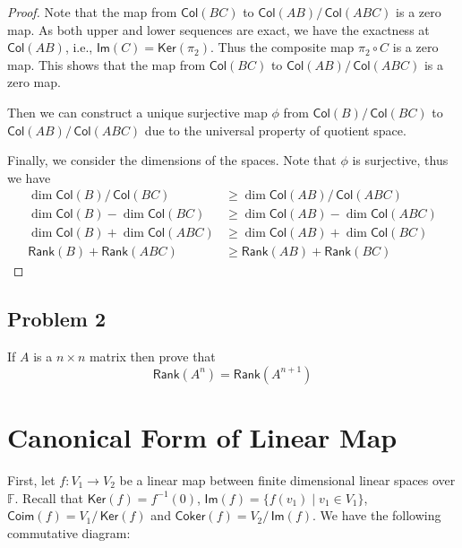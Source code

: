 \documentclass[
	11pt, %
	fleqn, %
	a4paper, %
]{LegrandOrangeBook}
\renewcommand{\ker}[1]{\mathsf{Ker}(#1)} %
\renewcommand{\Im}[1]{\mathsf{Im}(#1)} %
\newcommand{\quotient}[2]{#1/\, #2} %
\newcommand{\F}{\mathbb{F}} %
\newcommand{\rank}[1]{\mathsf{Rank}(#1)} %
\newcommand{\coker}[1]{\mathsf{Coker}(#1)} %
\newcommand{\coim}[1]{\mathsf{Coim}(#1)} %
\newcommand{\col}[1]{\mathsf{Col}(#1)} %
\begin{document}
\begin{proof}
    Note that the map from $\col{BC}$ to $\quotient{\col{AB}}{\col{ABC}}$ is a zero map. As both upper and lower sequences are exact, we have the exactness at $\col{AB}$, i.e., $\Im{C} = \ker{\pi_2}$. Thus the composite map $\pi_2 \circ C$ is a zero map. This shows that the map from $\col{BC}$ to $\quotient{\col{AB}}{\col{ABC}}$ is a zero map.

    Then we can construct a unique surjective map $\phi$ from $\quotient{\col{B}}{\col{BC}}$ to $\quotient{\col{AB}}{\col{ABC}}$ due to the universal property of quotient space.

    Finally, we consider the dimensions of the spaces. Note that $\phi$ is surjective, thus we have
    \[
        \begin{split}
            \dim{\quotient{\col{B}}{\col{BC}}} & \geq \dim{\quotient{\col{AB}}{\col{ABC}}} \\
            \dim{\col{B}} - \dim{\col{BC}} & \geq \dim{\col{AB}} - \dim{\col{ABC}} \\
            \dim{\col{B}} + \dim{\col{ABC}} & \geq \dim{\col{AB}} + \dim{\col{BC}} \\
            \rank{B} + \rank{ABC} & \geq \rank{AB} + \rank{BC}
        \end{split}
    \]
\end{proof}

\subsection{Problem 2}

\begin{problem}
    If $A$ is a $n \times n$ matrix then prove that
    \[
        \rank{A^n} = \rank{A^{n+1}}
    \]
\end{problem}


\newpage

\section{Canonical Form of Linear Map}

First, let $f : V_1 \to V_2$ be a linear map between finite dimensional linear spaces over $\F$. Recall that $\ker{f} = f^{-1} (0)$, $\Im{f} = \{f(v_1) \mid v_1 \in V_1\}$, $\coim{f} = \quotient{V_1}{\ker{f}}$ and $\coker{f} = \quotient{V_2}{\Im{f}}$. We have the following commutative diagram:

\begin{center}
\end{center}
\end{document}
